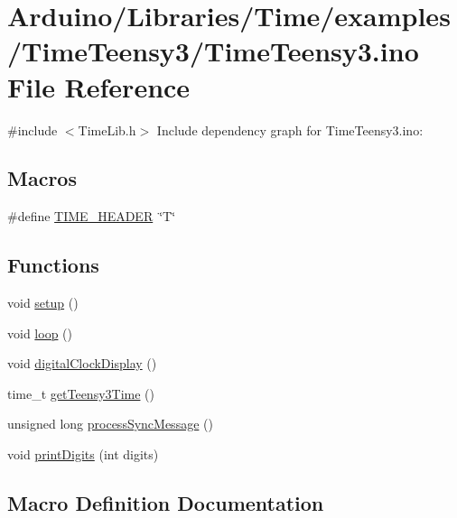 \hypertarget{_time_teensy3_8ino}{}\section{Arduino/\+Libraries/\+Time/examples/\+Time\+Teensy3/\+Time\+Teensy3.ino File Reference}
\label{_time_teensy3_8ino}
{\ttfamily \#include $<$Time\+Lib.\+h$>$}\newline
Include dependency graph for Time\+Teensy3.\+ino\+:
\subsection*{Macros}
\begin{DoxyCompactItemize}
\item 
\#define \hyperlink{_time_teensy3_8ino_aa9f2cbf2a35ec653aff12241a63ca864}{T\+I\+M\+E\+\_\+\+H\+E\+A\+D\+ER}~\char`\"{}T\char`\"{}
\end{DoxyCompactItemize}
\subsection*{Functions}
\begin{DoxyCompactItemize}
\item 
void \hyperlink{_time_teensy3_8ino_a4fc01d736fe50cf5b977f755b675f11d}{setup} ()
\item 
void \hyperlink{_time_teensy3_8ino_afe461d27b9c48d5921c00d521181f12f}{loop} ()
\item 
void \hyperlink{_time_teensy3_8ino_a01f3a72442d58926459c48afce4746e7}{digital\+Clock\+Display} ()
\item 
time\+\_\+t \hyperlink{_time_teensy3_8ino_a3e0781915a9e0f2045e892efe59f9fdc}{get\+Teensy3\+Time} ()
\item 
unsigned long \hyperlink{_time_teensy3_8ino_ab1e6944e759fa7efc4631df7f3268411}{process\+Sync\+Message} ()
\item 
void \hyperlink{_time_teensy3_8ino_a772afab0396032477ec7b01d14c774b2}{print\+Digits} (int digits)
\end{DoxyCompactItemize}


\subsection{Macro Definition Documentation}
\mbox{\label{_time_teensy3_8ino_aa9f2cbf2a35ec653aff12241a63ca864}} 
